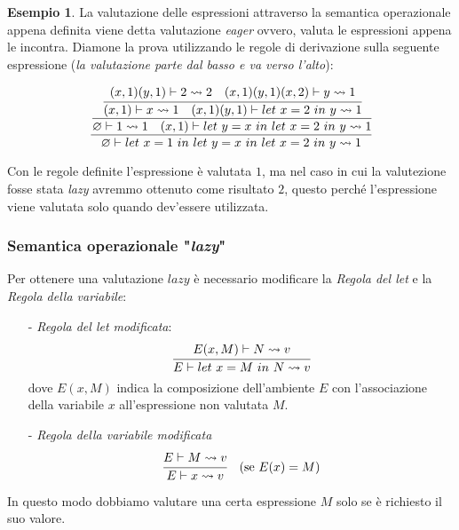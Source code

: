 \documentclass{article}
\theoremstyle{definition}
\theoremstyle{definition}
\theoremstyle{definition}
\newtheorem{example}[theorem]{Esempio}
\theoremstyle{remark}
\begin{document}
\begin{example} La valutazione delle espressioni attraverso la semantica operazionale appena definita viene detta valutazione \textit{eager} ovvero, valuta le espressioni appena le incontra. Diamone la prova utilizzando le regole di derivazione sulla
    seguente espressione (\textit{la valutazione parte dal basso e va verso l'alto}):

    $$\cfrac{\cfrac{\cfrac{(x,1)(y,1)\vdash 2\leadsto 2 \quad (x,1)(y,1)(x,2)\vdash y\leadsto 1}{(x,1)\vdash x \leadsto 1 \quad (x,1)(y,1)\vdash\text{$let$ $x=2$ $in$ $y\leadsto 1$}}}{\varnothing \vdash 1\leadsto 1\quad (x,1)\vdash\text{$let$ $y=x$ $in$ $let$ $x=2$ $in$ $y\leadsto 1$}}}{\varnothing\vdash \text{$let$ $x=1$ $in$ $let$ $y=x$ $in$ $let$ $x=2$ $in$ $y\leadsto 1$}}$$

    Con le regole definite l'espressione è valutata $1$, ma nel caso in cui la valutezione fosse stata \textit{lazy} avremmo ottenuto come risultato $2$,
    questo perché l'espressione viene valutata solo quando dev'essere utilizzata.
\end{example}
\subsubsection{Semantica operazionale "\textit{\textbf{lazy}}"}
Per ottenere una valutazione $lazy$ è necessario modificare la \textit{Regola del let} e la \textit{Regola della variabile}:
\begin{itemize}
    \item [-] \textit{Regola del let modificata}: $$\cfrac{E(x,M)\vdash N \leadsto v}{E\vdash \text{$let$ $x=M$ $in$ $N\leadsto v$}}$$
          dove $E(x,M)$ indica la composizione dell'ambiente $E$ con l'associazione della variabile $x$ all'espressione non valutata $M$.
    \item [-] \textit{Regola della variabile modificata} $$\cfrac{E\vdash M\leadsto v}{E \vdash x \leadsto v}\quad (\text{se $E(x) = M$} )$$
\end{itemize}
In questo modo dobbiamo valutare una certa espressione $M$ solo se è richiesto il suo valore.
\end{document}
